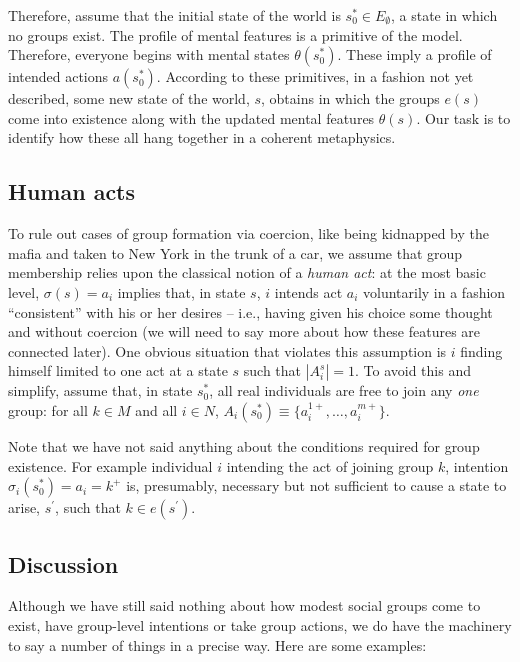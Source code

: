 \documentclass[
11pt,
titlepage,
reqno,
]{article}%
\theoremstyle{definition}
\begin{document}
	Therefore, assume that the initial state of the world is $s_0^\ast\in E_\emptyset$, a state in which no groups exist. The profile of mental features is a primitive of the model. Therefore, everyone begins with mental states $\theta(s_0^\ast)$. These imply a profile of intended actions $a(s_0^\ast)$. According to these primitives, in a fashion not yet described, some new state of the world, $s$, obtains in which the groups $e(s)$ come into existence along with the updated mental features $\theta(s)$.  Our task is to identify how these all hang together in a coherent metaphysics.
	
	
	\subsection{Human acts\label{human acts}}
	To rule out cases of group formation via coercion, like being kidnapped by the mafia and taken to New York in the trunk of a car, we assume that group membership relies upon the classical notion of a \textit{human act}: at the most basic level, $\sigma( s)=a_i$ implies that, in state $ s$, $i$ intends act $a_i$ voluntarily in a fashion ``consistent'' with his or her desires -- i.e., having given his choice some thought and without coercion (we will need to say more about how these features are connected later). One obvious situation that violates this assumption is $i$ finding himself limited to one act at a state $ s$ such that $|A_i^s|=1$. To avoid this and simplify, assume that, in state $s_0^\ast$, all real individuals are free to join any \textit{one} group: for all $k\in M$ and all $i\in N$, $A_i(s_0^\ast)\equiv \{a_i^{1+},\ldots,a_i^{m+}\}$.
	
	Note that we have not said anything about the conditions required for group existence. For example individual $i$ intending the act of joining  group $k$, intention $\sigma_i(s_0^\ast)=a_i=k^+$ is, presumably, necessary but not sufficient to cause a state to arise, $ s^\prime$, such that $k\in e(s^\prime)$. 
	
	
	
	\subsection{Discussion}
	
	Although we have still said nothing about how modest social groups come to exist, have group-level intentions or take group actions, we do have the machinery to say a number of things in a precise way. Here are some examples:
	
\end{document}
